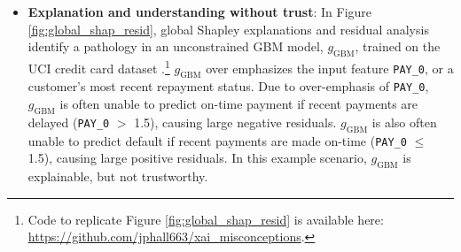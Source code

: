 \documentclass[fleqn]{article}
\begin{document}
\begin{itemize}

\item \textbf{Explanation and understanding without trust}: In Figure \ref{fig:global_shap_resid}, global Shapley explanations and residual analysis identify a pathology in an unconstrained GBM model, $g_{\text{GBM}}$, trained on the UCI credit card dataset \cite{uci}.\footnote{Code to replicate Figure \ref{fig:global_shap_resid} is available here: \url{https://github.com/jphall663/xai_misconceptions}.} $g_{\text{GBM}}$ over emphasizes the input feature \texttt{PAY\_0}, or a customer's most recent repayment status. Due to over-emphasis of \texttt{PAY\_0}, $g_{\text{GBM}}$ is often unable to predict on-time payment if recent payments are delayed (\texttt{PAY\_0} $>$ 1.5), causing large negative residuals. $g_{\text{GBM}}$ is also often unable to predict default if recent payments are made on-time (\texttt{PAY\_0} $\leq$ 1.5), causing large positive residuals. In this example scenario, $g_{\text{GBM}}$ is explainable, but not trustworthy. 


\end{itemize}
\end{document}
